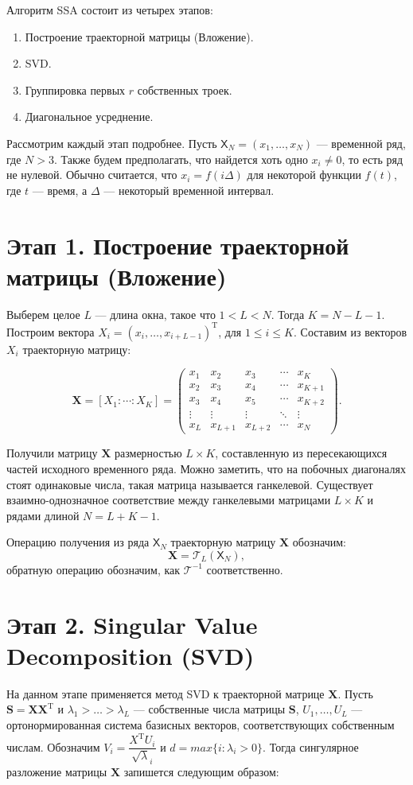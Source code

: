\documentclass[specialist,
               substylefile = spbu.rtx,
               subf,href,colorlinks=true, 12p]{disser}
\begin{document}
Алгоритм SSA состоит из четырех этапов:
\begin{enumerate}
	\item Построение траекторной матрицы (Вложение).
	\item SVD.
	\item Группировка первых $r$ собственных троек.
	\item Диагональное усреднение.
\end{enumerate}

Рассмотрим каждый этап подробнее. Пусть $\mathsf{X}_N = (x_1, \ldots, x_{N})$ --- временной ряд, где $N > 3$. Также будем предполагать, что найдется хоть одно $x_i \neq 0$, то есть ряд не нулевой. Обычно считается, что $x_i = f(i\Delta)$ для некоторой функции $f(t)$, где $t$ --- время, а $\Delta$ --- некоторый временной интервал. \\

\section{Этап 1. Построение траекторной матрицы (Вложение)}
Выберем целое $L$ --- длина окна, такое что $1 < L < N$. Тогда $K = N - L - 1$.
Построим вектора
$X_i = (x_{i} , \dots, x_{i+L-1})^\mathrm{T}$, для $1 \leqslant i \leqslant K$.
Составим из векторов $X_i$ траекторную матрицу:

$$\mathbf{X} = [X_1 : \cdots : X_K] =
\begin{pmatrix}
	x_1& x_2& x_3& \cdots& x_{K} \\
	x_2& x_3& x_4& \cdots& x_{K+1} \\
	x_3& x_4& x_5& \cdots& x_{K+2} \\
	\vdots& \vdots& \vdots& \ddots& \vdots \\
	x_{L}& x_{L+1}& x_{L+2}& \cdots& x_{N}
\end{pmatrix}
.$$

Получили матрицу $\mathbf{X}$ размерностью $L \times K$, составленную из пересекающихся частей  исходного временного ряда. Можно заметить, что на побочных диагоналях стоят одинаковые числа, такая матрица называется ганкелевой. Существует взаимно-однозначное соответствие между ганкелевыми матрицами $L \times K$ и рядами длиной $N = L + K - 1$.

Операцию получения из ряда $\mathsf{X}_N$ траекторную матрицу $\mathbf{X}$ обозначим:
$$ \mathbf{X} = \mathcal{T}_L(\mathsf{X}_N), $$
обратную операцию обозначим, как $\mathcal{T}^{-1}$ соответственно.

\section{Этап 2. Singular Value Decomposition (SVD)}
\label{ssasvd}
На данном этапе применяется метод SVD к траекторной матрице $\mathbf{X}$. Пусть $ \mathbf{S}  = \mathbf{X}\mathbf{X}^\mathrm{T}$ и $\lambda_1 > \dotsc > \lambda_L$ --- собственные числа матрицы $\mathbf{S}$, $U_1, \dotsc, U_L$ --- ортонормированная система базисных векторов, соответствующих собственным числам. Обозначим $V_i = \dfrac{X^\mathrm{T} U_i}{\sqrt \lambda_i}$ и $d = max\{i : \lambda_i > 0\}$. Тогда сингулярное разложение матрицы $\mathbf{X}$ запишется следующим образом:
\end{document}
